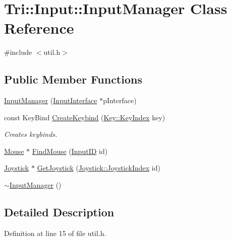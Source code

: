 \hypertarget{class_tri_1_1_input_1_1_input_manager}{}\section{Tri\+:\+:Input\+:\+:Input\+Manager Class Reference}
\label{class_tri_1_1_input_1_1_input_manager}


{\ttfamily \#include $<$util.\+h$>$}

\subsection*{Public Member Functions}
\begin{DoxyCompactItemize}
\item 
\hyperlink{class_tri_1_1_input_1_1_input_manager_a65904bedac8cfb6d5e1f850e4dd54199}{Input\+Manager} (\hyperlink{struct_tri_1_1_input_1_1_input_interface}{Input\+Interface} $\ast$p\+Interface)
\item 
const Key\+Bind \hyperlink{class_tri_1_1_input_1_1_input_manager_acd709842db26623059ff81b54cdecaec}{Create\+Keybind} (\hyperlink{struct_tri_1_1_input_1_1_key_a0b1f54fb1b7be8fe2e920ca8552f86dc}{Key\+::\+Key\+Index} key)
\begin{DoxyCompactList}\small\item\em Creates keybinds. \end{DoxyCompactList}\item 
\hyperlink{class_tri_1_1_input_1_1_mouse}{Mouse} $\ast$ \hyperlink{class_tri_1_1_input_1_1_input_manager_aa4b3489c007d73cee3068ce500ad4483}{Find\+Mouse} (\hyperlink{namespace_tri_1_1_input_ac94df02dceb9dbc5ca1512e9ded38154}{Input\+I\+D} id)
\item 
\hyperlink{class_tri_1_1_input_1_1_joystick}{Joystick} $\ast$ \hyperlink{class_tri_1_1_input_1_1_input_manager_a7246bdc03dd3866be94acc2f829eb369}{Get\+Joystick} (\hyperlink{class_tri_1_1_input_1_1_joystick_ae053177eed8f746c683d7bb9afc8dbb3}{Joystick\+::\+Joystick\+Index} id)
\item 
\hyperlink{class_tri_1_1_input_1_1_input_manager_a1c9b663050157ebe8ce1c66c36b63a4d}{$\sim$\+Input\+Manager} ()
\end{DoxyCompactItemize}


\subsection{Detailed Description}


Definition at line 15 of file util.\+h.



